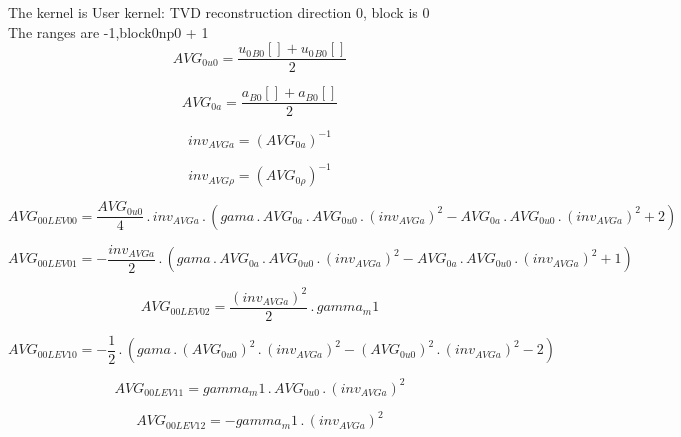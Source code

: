 \documentclass{article}
\begin{document}
\noindent The kernel is User kernel: TVD reconstruction direction 0, block is 0\\\noindent The ranges are -1,block0np0 + 1\\\begin{dmath}AVG_{0 u0} = \frac{{u_{0}{_{B0}}}[{}] + {u_{0}{_{B0}}}[{}]}{2}\end{dmath}

\begin{dmath}AVG_{0 a} = \frac{{a{_{B0}}}[{}] + {a{_{B0}}}[{}]}{2}\end{dmath}

\begin{dmath}inv_{AVG a} = \left(AVG_{0 a} \right)^{-1}\end{dmath}

\begin{dmath}inv_{AVG \rho} = \left(AVG_{0 \rho} \right)^{-1}\end{dmath}

\begin{dmath}AVG_{0 0 LEV 00} = \frac{AVG_{0 u0}}{4} \,.\, inv_{AVG a} \,.\, \left(gama \,.\, AVG_{0 a} \,.\, AVG_{0 u0} \,.\, \left(inv_{AVG a} \right)^{2} - AVG_{0 a} \,.\, AVG_{0 u0} \,.\, \left(inv_{AVG a} \right)^{2} + 2\right)\end{dmath}

\begin{dmath}AVG_{0 0 LEV 01} = - \frac{inv_{AVG a}}{2} \,.\, \left(gama \,.\, AVG_{0 a} \,.\, AVG_{0 u0} \,.\, \left(inv_{AVG a} \right)^{2} - AVG_{0 a} \,.\, AVG_{0 u0} \,.\, \left(inv_{AVG a} \right)^{2} + 1\right)\end{dmath}

\begin{dmath}AVG_{0 0 LEV 02} = \frac{\left(inv_{AVG a} \right)^{2}}{2} \,.\, gamma_m1\end{dmath}

\begin{dmath}AVG_{0 0 LEV 10} = - \frac{1}{2} \,.\, \left(gama \,.\, \left(AVG_{0 u0} \right)^{2} \,.\, \left(inv_{AVG a} \right)^{2} - \left(AVG_{0 u0} \right)^{2} \,.\, \left(inv_{AVG a} \right)^{2} - 2\right)\end{dmath}

\begin{dmath}AVG_{0 0 LEV 11} = gamma_m1 \,.\, AVG_{0 u0} \,.\, \left(inv_{AVG a} \right)^{2}\end{dmath}

\begin{dmath}AVG_{0 0 LEV 12} = - gamma_m1 \,.\, \left(inv_{AVG a} \right)^{2}\end{dmath}
\end{document}
